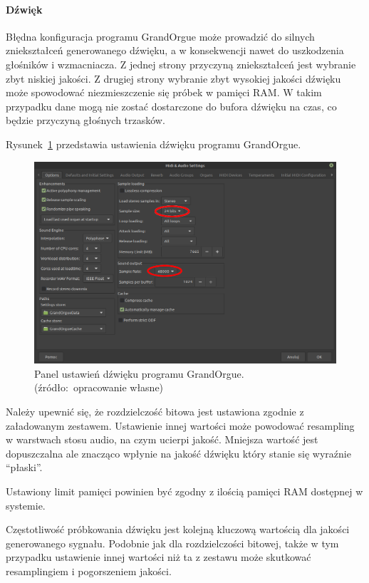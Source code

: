 \documentclass[11pt]{report}
\begin{document}
    \paragraph{Dźwięk}
    Błędna konfiguracja programu GrandOrgue może prowadzić do silnych zniekształceń generowanego dźwięku, a w konsekwencji nawet do uszkodzenia głośników i wzmacniacza.
    Z jednej strony przyczyną zniekształceń jest wybranie zbyt niskiej jakości.
    Z drugiej strony wybranie zbyt wysokiej jakości dźwięku może spowodować niezmieszczenie się próbek w pamięci RAM.
    W takim przypadku dane mogą nie zostać dostarczone do bufora dźwięku na czas, co będzie przyczyną głośnych trzasków.

    Rysunek~\ref{fig:ustawienia-dzwieku} przedstawia ustawienia dźwięku programu GrandOrgue.
    \begin{figure}[!htp]
        \centering
        \includegraphics[width=\linewidth]{fig/optionsR.png}
        \caption{Panel ustawień dźwięku programu GrandOrgue. (źródło:~opracowanie własne)}
        \label{fig:ustawienia-dzwieku}
    \end{figure}

    Należy upewnić się, że rozdzielczość bitowa jest ustawiona zgodnie z załadowanym zestawem.
    Ustawienie innej wartości może powodować resampling w warstwach stosu audio, na czym ucierpi jakość.
    Mniejsza wartość jest dopuszczalna ale znacząco wpłynie na jakość dźwięku który stanie się wyraźnie ``płaski''.

    Ustawiony limit pamięci powinien być zgodny z ilością pamięci RAM dostępnej w systemie.

    Częstotliwość próbkowania dźwięku jest kolejną kluczową wartością dla jakości generowanego sygnału.
    Podobnie jak dla rozdzielczości bitowej, także w tym przypadku ustawienie innej wartości niż ta z zestawu może skutkować resamplingiem i pogorszeniem jakości.
\end{document}
